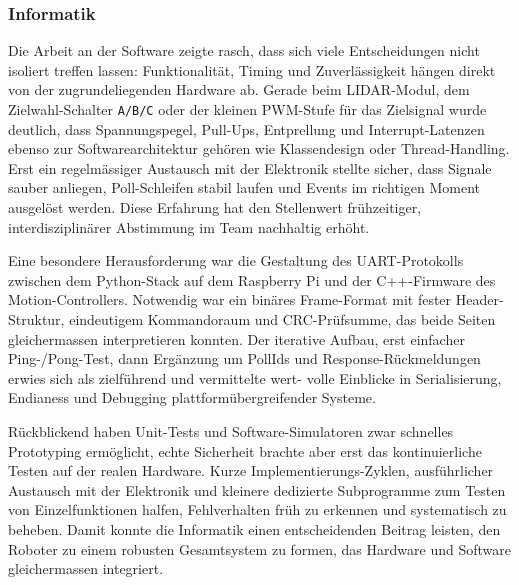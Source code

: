 \documentclass[main.tex]{subfiles} %
\begin{document}
\subsubsection{Informatik}
Die Arbeit an der Software zeigte rasch, dass sich viele Entscheidungen
nicht isoliert treffen lassen: Funktionalität, Timing und Zuverlässigkeit
hängen direkt von der zugrundeliegenden Hardware ab. Gerade beim
LIDAR-Modul, dem Zielwahl-Schalter \texttt{A/B/C} oder der kleinen
PWM-Stufe für das Zielsignal wurde deutlich, dass Spannungspegel,
Pull-Ups, Entprellung und Interrupt-Latenzen ebenso zur
Softwarearchitektur gehören wie Klassendesign oder Thread-Handling.
Erst ein regelmässiger Austausch mit der Elektronik stellte sicher, dass
Signale sauber anliegen, Poll-Schleifen stabil laufen und Events im
richtigen Moment ausgelöst werden. Diese Erfahrung hat den Stellenwert
frühzeitiger, interdisziplinärer Abstimmung im Team nachhaltig erhöht.

Eine besondere Herausforderung war die Gestaltung des UART-Protokolls
zwischen dem Python-Stack auf dem Raspberry Pi und der C++-Firmware des
Motion-Controllers. Notwendig war ein binäres Frame-Format mit fester
Header-Struktur, eindeutigem Kommandoraum und CRC-Prüfsumme, das beide
Seiten gleichermassen interpretieren konnten. Der iterative Aufbau, erst einfacher
Ping-/Pong-Test, dann Ergänzung um PollIds und
Response-Rückmeldungen erwies sich als zielführend und vermittelte wert-
volle Einblicke in Serialisierung, Endianess und Debugging
plattformübergreifender Systeme.

Rückblickend haben Unit-Tests und Software-Simulatoren zwar
schnelles Prototyping ermöglicht, echte Sicherheit brachte aber erst das
kontinuierliche Testen auf der realen Hardware. Kurze
Implementierungs-Zyklen, ausführlicher Austausch mit der Elektronik und kleinere
dedizierte Subprogramme zum Testen von Einzelfunktionen halfen,
Fehlverhalten früh zu erkennen und systematisch zu beheben. Damit
konnte die Informatik einen entscheidenden Beitrag leisten, den Roboter
zu einem robusten Gesamtsystem zu formen, das Hardware und Software
gleichermassen integriert.
\end{document}
